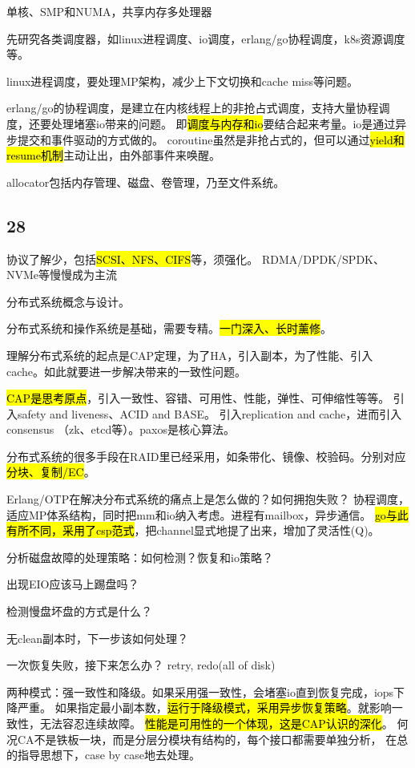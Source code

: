 单核、SMP和NUMA，共享内存多处理器

先研究各类调度器，如linux进程调度、io调度，erlang/go协程调度，k8s资源调度等。

linux进程调度，要处理MP架构，减少上下文切换和cache miss等问题。

erlang/go的协程调度，是建立在内核线程上的非抢占式调度，支持大量协程调度，还要处理堵塞io带来的问题。
即\hl{调度与内存和io}要结合起来考量。io是通过异步提交和事件驱动的方式做的。
coroutine虽然是非抢占式的，但可以通过\hl{yield和resume机制}主动让出，由外部事件来唤醒。

allocator包括内存管理、磁盘、卷管理，乃至文件系统。

\subsection{28}

协议了解少，包括\hl{SCSI、NFS、CIFS}等，须强化。
RDMA/DPDK/SPDK、NVMe等慢慢成为主流

\hrulefill

分布式系统概念与设计。

分布式系统和操作系统是基础，需要专精。\hl{一门深入、长时薰修}。

理解分布式系统的起点是CAP定理，为了HA，引入副本，为了性能、引入cache。如此就要进一步解决带来的一致性问题。

\hl{CAP是思考原点}，引入一致性、容错、可用性、性能，弹性、可伸缩性等等。
引入safety and liveness、ACID and BASE。
引入replication and cache，进而引入consensus （zk、etcd等）。paxos是核心算法。

分布式系统的很多手段在RAID里已经采用，如条带化、镜像、校验码。分别对应\hl{分块、复制/EC}。

Erlang/OTP在解决分布式系统的痛点上是怎么做的？如何拥抱失败？
协程调度，适应MP体系结构，同时把mm和io纳入考虑。进程有mailbox，异步通信。
\hl{go与此有所不同，采用了csp范式}，把channel显式地提了出来，增加了灵活性(Q)。

分析磁盘故障的处理策略：如何检测？恢复和io策略？
\begin{enumbox}
\item 出现EIO应该马上踢盘吗？
\item 检测慢盘坏盘的方式是什么？
\item 无clean副本时，下一步该如何处理？
\item 一次恢复失败，接下来怎么办？ retry, redo(all of disk)
\end{enumbox}

两种模式：强一致性和降级。如果采用强一致性，会堵塞io直到恢复完成，iops下降严重。
如果指定最小副本数，\hl{运行于降级模式，采用异步恢复策略}。就影响一致性，无法容忍连续故障。
\hl{性能是可用性的一个体现，这是CAP认识的深化}。
何况CA不是铁板一块，而是分层分模块有结构的，每个接口都需要单独分析，
在总的指导思想下，case by case地去处理。

